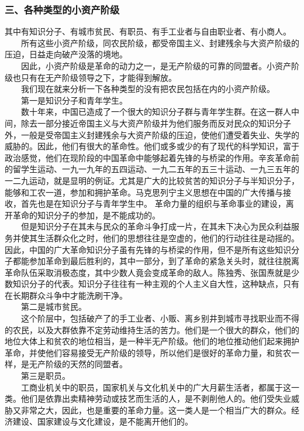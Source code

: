 \documentclass[cn,11pt,chinese]{elegantbook}
\def\myformat#1{\hfil\hfil #1}
\begin{document}
\subsubsection*{\myformat{三、各种类型的小资产阶级}}
其中有知识分子、有城市贫民、有职员、有手工业者与自由职业者、有小商人。\\
　　所有这些小资产阶级，同农民阶级，都受帝国主义、封建残余与大资产阶级的压迫，日益走向破产没落的境地。\\
　　因此，小资产阶级是革命的动力之一，是无产阶级的可靠的同盟者。小资产阶级也只有在无产阶级领导之下，才能得到解放。\\
　　我们现在就来分析一下各种类型的没有把农民包括在内的小资产阶级。\\
　　第一是知识分子和青年学生。\\
　　数十年来，中国已造成了一个很大的知识分子群与青年学生群。在这一群人中间，除去一部分接近帝国主义与大资产阶级并为他们服务而反对民众的知识分子外，一般是受帝国主义封建残余与大资产阶级的压迫，使他们遭受着失业、失学的威胁的。因此，他们有很大的革命性。他们或多或少的有了现代的科学知识，富于政治感觉，他们在现阶段的中国革命中能够起着先锋的与桥梁的作用。辛亥革命前的留学生运动、一九一九年的五四运动、一九二五年的五三十运动、一九三五年的一二九运动，就是显明的例证。尤其是广大的比较贫苦的知识分子与半知识分子，能够和工农一道，参加和拥护革命。马克思列宁主义思想在中国的广大传播与接收，首先也是在知识分子与青年学生中。 革命力量的组织与革命事业的建设，离开革命的知识分子的参加，是不能成功的。\\
　　但是知识分子在其未与民众的革命斗争打成一片，在其未下决心为民众利益服务并使其生活群众化之时，他们的思想往往是空虚的，他们的行动往往是动摇的。因此，中国的广大革命知识分子虽有先锋的与桥梁的作用，但不是所有这些知识分子都能参加革命到最后胜利的，其中一部分，到了革命的紧急关头时，就往往脱离革命队伍采取消极态度，其中少数人竟会变成革命的敌人。陈独秀、张国焘就是少数知识分子的代表。知识分子往往有一种主观的个人主义自大性，这种缺点，只有在长期群众斗争中才能洗刷干净。\\
　　第二是城市贫民。\\
　　这个阶层中，包括破产了的手工业者、小贩、离乡别井到城市寻找职业而不得的农民，以及大群依靠不定劳动维持生活的苦力。他们是一个很大的群众，他们的地位大体上和贫农的地位相当，是一种半无产阶级。他们的地位推动他们起来拥护革命，并使他们容易接受无产阶级的领导，所以他们是很好的革命力量，和贫农一样，是无产阶级的天然的同盟者。\\
　　第三是职员。\\
　　工商业机关中的职员，国家机关与文化机关中的广大月薪生活者，都属于这一类。他们是依靠出卖精神劳动或技艺而生活的人，是不剥削他人的。他们受失业威胁又非常之大，因此，也是重要的革命力量。这一类人是一个相当广大的群众。经济建设、国家建设与文化建设，是不能离开他们的。\\
\end{document}
